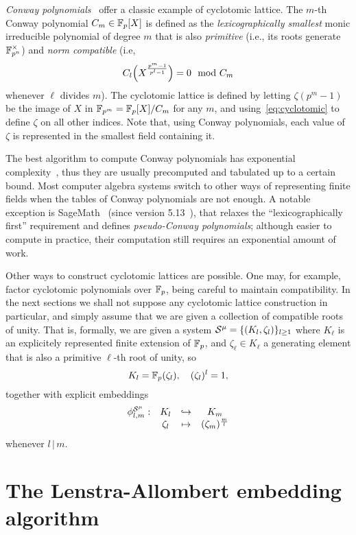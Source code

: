 \documentclass{sig-alternate}
\begin{document}
\emph{Conway polynomials}~\cite{Nickel1988} offer a classic example of
cyclotomic lattice. %
The $m$-th Conway polynomial $C_m\in\F_p[X]$ is defined as the
\emph{lexicographically smallest} monic irreducible polynomial of
degree $m$ that is also \emph{primitive} (i.e., its roots generate
$\F_{p^n}^\times$) and \emph{norm compatible} (i.e,
$$C_\ell\Bigl(X^{\frac{p^m-1}{p^\ell-1}}\Bigr) = 0 \mod C_m$$
whenever $\ell$ divides $m$). %
The cyclotomic lattice is defined by letting $\zeta(p^m-1)$ be the
image of $X$ in $\F_{p^m}=\F_p[X]/C_m$ for any $m$, and
using~\eqref{eq:cyclotomic} to define $\zeta$ on all other indices. %
Note that, using Conway polynomials, each value of $\zeta$ is
represented in the smallest field containing it.

The best algorithm to compute Conway polynomials has exponential
complexity~\cite{heath+loehr99}, thus they are usually precomputed and
tabulated up to a certain bound. %
Most computer algebra systems switch to other ways of representing
finite fields when the tables of Conway polynomials are not enough. %
A notable exception is SageMath~\cite{Sage} (since version
5.13~\cite{Roe2013}), that relaxes the ``lexicographically first''
requirement and defines \emph{pseudo-Conway polynomials}; although
easier to compute in practice, their computation still requires an
exponential amount of work.

Other ways to construct cyclotomic lattices are possible. %
One may, for example, factor cyclotomic polynomials over $\F_p$, being
careful to maintain compatibility. %
In the next sections we shall not suppose any cyclotomic lattice
construction in particular, and simply assume that we are given a
collection of compatible roots of unity.
That is, formally, we are given a system $\system=\{(K_\ell,\zeta_\ell)\}_{\ell\geq1}$
where $K_\ell$ is an explicitely represented finite extension of $\F_p$,
and $\zeta_\ell\in K_\ell$ a generating element that is also a primitive $\ell$-th root
of unity,
so \[ K_\ell=\F_p(\zeta_\ell),\quad(\zeta_\ell)^\ell=1, \]
together with
explicit embeddings
\[
\begin{array}{cccc}
  \embedcyc{\ell}{m}: & K_\ell & \hookrightarrow & K_m \\
  & \zeta_\ell & \mapsto & (\zeta_{m})^{\frac{m}{\ell}}
\end{array}
\]
whenever $l\,|\,m$.

\section{The Lenstra-Allombert embedding algorithm}
\label{sec:lenstra}
\end{document}
